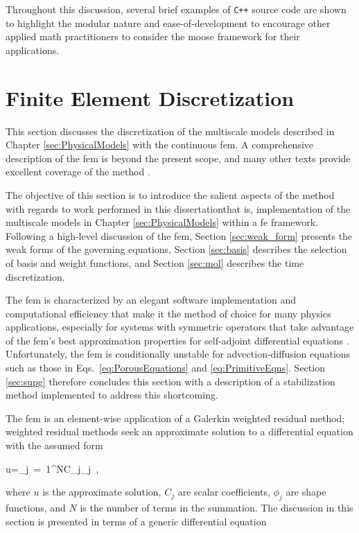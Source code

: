 Throughout this discussion, several brief examples of \texttt{C++} source code are shown to highlight the modular nature and ease-of-development to encourage other applied math practitioners to consider the \gls{moose} framework for their applications. 

\section{Finite Element Discretization}
\label{sec:fem}

This section discusses the discretization of the multiscale models described in Chapter \ref{sec:PhysicalModels} with the continuous \gls{fem}. A comprehensive description of the \gls{fem} is beyond the present scope, and many other texts provide excellent coverage of the method \cite{zienkiewicz,reddy,logan}. 

The objective of this section is to introduce the salient aspects of the method with regards to work performed in this dissertation\mdash that is, implementation of the multiscale models in Chapter \ref{sec:PhysicalModels} within a \gls{fe} framework. Following a high-level discussion of the \gls{fem}, Section \ref{sec:weak_form} presents the weak forms of the governing equations, Section \ref{sec:basis} describes the selection of basis and weight functions, and Section \ref{sec:mol} describes the time discretization. 

The \gls{fem} is characterized by an elegant software implementation and computational efficiency that make it the method of choice for many physics applications, especially for systems with symmetric operators that take advantage of the \gls{fem}'s best approximation properties for self-adjoint differential equations \cite{reddy,zohdi,zienkiewicz}. Unfortunately, the \gls{fem} is conditionally unstable for advection-diffusion equations such as those in Eqs.\ \eqref{eq:PorousEquations} and \eqref{eq:PrimitiveEqns}. Section \ref{sec:supg} therefore concludes this section with a description of a stabilization method implemented to address this shortcoming.

The \gls{fem} is an element-wise application of a Galerkin weighted residual method; weighted residual methods seek an approximate solution to a differential equation with the assumed form

\beq
\label{eq:WRExpansion}
u=\sum_{j\ =\ 1}^NC_j\phi_j\ ,
\eeq

\noindent where \(u\) is the approximate solution, \(C_j\) are scalar coefficients, \(\phi_j\) are shape functions, and \(N\) is the number of terms in the summation. The discussion in this section is presented in terms of a generic differential equation

